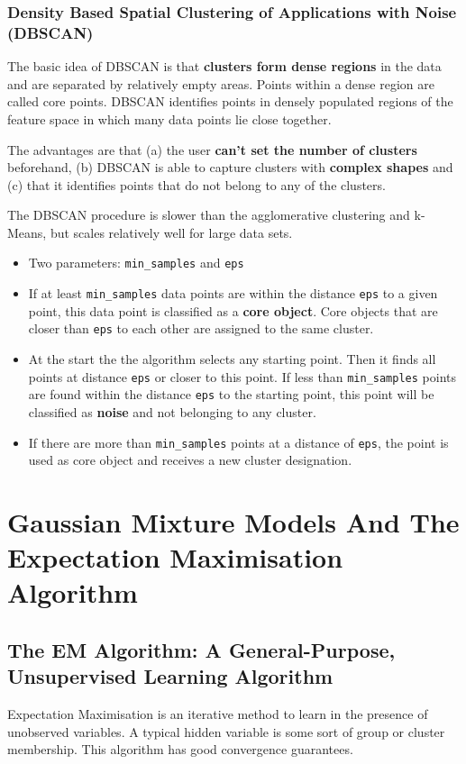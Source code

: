 \documentclass[11pt]{article}
\theoremstyle{definition}
\begin{document}
\subsubsection{Density Based Spatial Clustering of Applications with Noise (DBSCAN)}
The basic idea of DBSCAN is that \textbf{clusters form dense regions} in the data and are separated by relatively empty areas. Points within a dense region are called core points. DBSCAN identifies points in densely populated regions of the feature space in which many data points lie close together.

The advantages are that (a) the user \textbf{can't set the number of clusters} beforehand, (b) DBSCAN is able to capture clusters with \textbf{complex shapes} and (c) that it identifies points that do not belong to any of the clusters.

The DBSCAN procedure is slower than the agglomerative clustering and k-Means, but scales relatively well for large data sets.

\begin{itemize}
	\item Two parameters: \texttt{min\_samples} and \texttt{eps}
	\item If at least \texttt{min\_samples} data points are within the distance \texttt{eps} to a given point, this data point is classified as a \textbf{core object}. Core objects that are closer than \texttt{eps} to each other are assigned to the same cluster.
	\item At the start the the algorithm selects any starting point. Then it finds all points at distance \texttt{eps} or closer to this point. If less than \texttt{min\_samples} points are found within the distance \texttt{eps} to the starting point, this point will be classified as \textbf{noise} and not belonging to any cluster.
	\item If there are more than \texttt{min\_samples} points at a distance of \texttt{eps}, the point is used as core object and receives a new cluster designation.
\end{itemize}

\section{Gaussian Mixture Models And The Expectation Maximisation Algorithm}
\subsection{The EM Algorithm: A General-Purpose, Unsupervised Learning Algorithm}
Expectation Maximisation is an iterative method to learn in the presence of unobserved variables. A typical hidden variable is some sort of group or cluster membership. This algorithm has good convergence guarantees.
\end{document}
